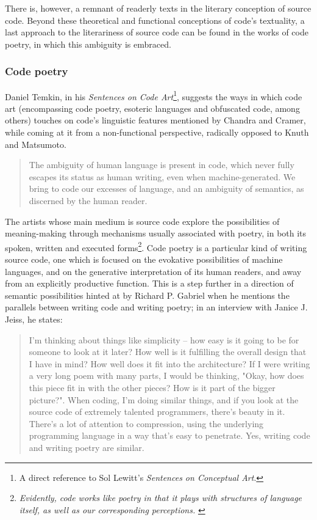 There is, however, a remnant of readerly texts in the literary conception of source code. Beyond these theoretical and functional conceptions of code's textuality, a last approach to the literariness of source code can be found in the works of code poetry, in which this ambiguity is embraced.

\subsubsection{Code poetry}
\label{subsubsec:code-poetry}

Daniel Temkin, in his \emph{Sentences on Code Art}\footnote{A direct reference to Sol Lewitt's \emph{Sentences on Conceptual Art}.}, suggests the ways in which code art (encompassing code poetry, esoteric languages and obfuscated code, among others) touches on code's linguistic features mentioned by Chandra and Cramer, while coming at it from a non-functional perspective, radically opposed to Knuth and Matsumoto.

\begin{quote}
  The ambiguity of human language is present in code, which never fully escapes its status as human writing, even when machine-generated. We bring to code our excesses of language, and an ambiguity of semantics, as discerned by the human reader. \citep{temkin_sentences_2017}
\end{quote}

The artists whose main medium is source code explore the possibilities of meaning-making through mechanisms usually associated with poetry, in both its spoken, written and executed forms\footnote{\emph{Evidently, code works like poetry in that it plays with structures of language itself, as well as our corresponding perceptions.} \citep{cox_aesthetics_2011}}. Code poetry is a particular kind of writing source code, one which is focused on the evokative possibilities of machine languages, and on the generative interpretation of its human readers, and away from an explicitly productive function. This is a step further in a direction of semantic possibilities hinted at by Richard P. Gabriel when he mentions the parallels between writing code and writing poetry; in an interview with Janice J. Jeiss, he states:

\begin{quote}
  I'm thinking about things like simplicity -- how easy is it going to be for someone to look at it later? How well is it fulfilling the overall design that I have in mind? How well does it fit into the architecture? If I were writing a very long poem with many parts, I would be thinking, "Okay, how does this piece fit in with the other pieces? How is it part of the bigger picture?". When coding, I'm doing similar things, and if you look at the source code of extremely talented programmers, there's beauty in it. There's a lot of attention to compression, using the underlying programming language in a way that's easy to penetrate. Yes, writing code and writing poetry are similar.  \citep{jeiss_poetry_2002}
\end{quote}

